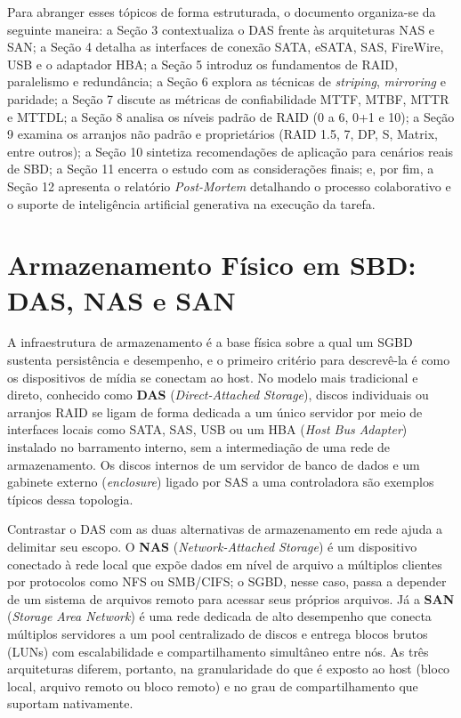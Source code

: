 \documentclass[11pt,a4paper]{article}
\begin{document}
Para abranger esses tópicos de forma estruturada, o documento organiza-se da seguinte maneira: a Seção 3 contextualiza o DAS frente às arquiteturas NAS e SAN; a Seção 4 detalha as interfaces de conexão SATA, eSATA, SAS, FireWire, USB e o adaptador HBA; a Seção 5 introduz os fundamentos de RAID, paralelismo e redundância; a Seção 6 explora as técnicas de \emph{striping}, \emph{mirroring} e paridade; a Seção 7 discute as métricas de confiabilidade MTTF, MTBF, MTTR e MTTDL; a Seção 8 analisa os níveis padrão de RAID (0 a 6, 0+1 e 10); a Seção 9 examina os arranjos não padrão e proprietários (RAID 1.5, 7, DP, S, Matrix, entre outros); a Seção 10 sintetiza recomendações de aplicação para cenários reais de SBD; a Seção 11 encerra o estudo com as considerações finais; e, por fim, a Seção 12 apresenta o relatório \emph{Post-Mortem} detalhando o processo colaborativo e o suporte de inteligência artificial generativa na execução da tarefa.

\section{Armazenamento Físico em SBD: DAS, NAS e SAN}
A infraestrutura de armazenamento é a base física sobre a qual um SGBD sustenta persistência e
desempenho, e o primeiro critério para descrevê-la é como os dispositivos de mídia se conectam ao
host. No modelo mais tradicional e direto, conhecido como \textbf{DAS} (\emph{Direct-Attached
Storage}), discos individuais ou arranjos RAID se ligam de forma dedicada a um único servidor por
meio de interfaces locais como SATA, SAS, USB ou um HBA (\emph{Host Bus Adapter}) instalado no
barramento interno, sem a intermediação de uma rede de armazenamento. Os discos internos de um
servidor de banco de dados e um gabinete externo (\emph{enclosure}) ligado por SAS a uma controladora
são exemplos típicos dessa topologia.

Contrastar o DAS com as duas alternativas de armazenamento em rede ajuda a delimitar seu escopo. O
\textbf{NAS} (\emph{Network-Attached Storage}) é um dispositivo conectado à rede local que expõe
dados em nível de arquivo a múltiplos clientes por protocolos como NFS ou SMB/CIFS; o SGBD, nesse
caso, passa a depender de um sistema de arquivos remoto para acessar seus próprios arquivos. Já a
\textbf{SAN} (\emph{Storage Area Network}) é uma rede dedicada de alto desempenho que conecta múltiplos servidores a um pool
centralizado de discos e entrega blocos brutos (LUNs) com escalabilidade e compartilhamento
simultâneo entre nós. As três arquiteturas diferem, portanto, na granularidade do que é exposto ao
host (bloco local, arquivo remoto ou bloco remoto) e no grau de compartilhamento que suportam
nativamente.
\end{document}

